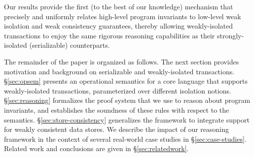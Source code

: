 \noindent Our results provide the first (to the best of our knowledge)
mechanism that precisely and uniformly relates high-level program
invariants to low-level weak isolation and weak consistency
guarantees, thereby allowing weakly-isolated transactions to enjoy the
same rigorous reasoning capabilities as their strongly-isolated
(serializable) counterparts.

The remainder of the paper is organized as follows. The next section
provides motivation and background on serializable and weakly-isolated
transactions. \S\ref{sec:opsem} presents an operational semantics for
a core language that supports weakly-isolated transactions,
parameterized over different isolation notions. \S\ref{sec:reasoning}
formalizes the proof system that we use to reason about program
invariants, and establishes the soundness of these rules with respect
to the semantics. \S\ref{sec:store-consistency} generalizes the
framework to integrate support for weakly consistent data stores. We
describe the impact of our reasoning framework in the context of
several real-world case studies in \S\ref{sec:case-studies}.  Related
work and conclusions are given in \S\ref{sec:relatedwork}.

